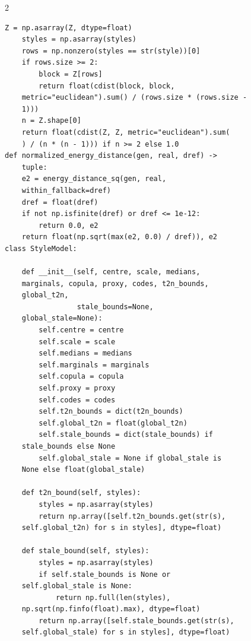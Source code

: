\begin{multicols}{2}
\begin{Verbatim}[fontsize=\scriptsize]
    Z = np.asarray(Z, dtype=float)
    styles = np.asarray(styles)
    rows = np.nonzero(styles == str(style))[0]
    if rows.size >= 2:
        block = Z[rows]
        return float(cdist(block, block,
    metric="euclidean").sum() / (rows.size * (rows.size -
    1)))
    n = Z.shape[0]
    return float(cdist(Z, Z, metric="euclidean").sum(
    ) / (n * (n - 1))) if n >= 2 else 1.0
def normalized_energy_distance(gen, real, dref) ->
    tuple:
    e2 = energy_distance_sq(gen, real,
    within_fallback=dref)
    dref = float(dref)
    if not np.isfinite(dref) or dref <= 1e-12:
        return 0.0, e2
    return float(np.sqrt(max(e2, 0.0) / dref)), e2
class StyleModel:

    def __init__(self, centre, scale, medians,
    marginals, copula, proxy, codes, t2n_bounds,
    global_t2n,
                 stale_bounds=None,
    global_stale=None):
        self.centre = centre
        self.scale = scale
        self.medians = medians
        self.marginals = marginals
        self.copula = copula
        self.proxy = proxy
        self.codes = codes
        self.t2n_bounds = dict(t2n_bounds)
        self.global_t2n = float(global_t2n)
        self.stale_bounds = dict(stale_bounds) if
    stale_bounds else None
        self.global_stale = None if global_stale is
    None else float(global_stale)

    def t2n_bound(self, styles):
        styles = np.asarray(styles)
        return np.array([self.t2n_bounds.get(str(s),
    self.global_t2n) for s in styles], dtype=float)

    def stale_bound(self, styles):
        styles = np.asarray(styles)
        if self.stale_bounds is None or
    self.global_stale is None:
            return np.full(len(styles),
    np.sqrt(np.finfo(float).max), dtype=float)
        return np.array([self.stale_bounds.get(str(s),
    self.global_stale) for s in styles], dtype=float)


\end{Verbatim}
\end{multicols}
